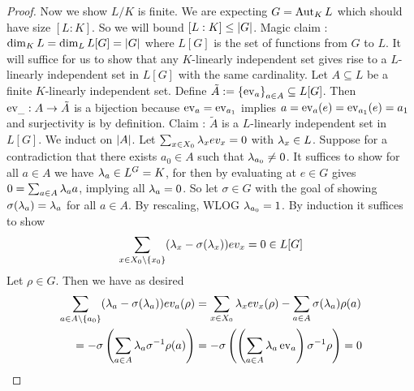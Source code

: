 \documentclass{article}
\begin{document}
\begin{proof}
  Now we show $L / K$ is finite.
  We are expecting $G = \operatorname{Aut}_K L$ which should have size $[L : K]$.
  So we will bound $[L : K] \leq \left\vert G \right\vert$.
  Magic claim : 
  $\dim_K L = \dim_L L[G] = \left\vert G \right\vert$
  where $L[G]$ is the set of functions from $G$ to $L$.
  It will suffice for us to show that
  any $K$-linearly independent set gives rise to
  a $L$-linearly independent set in $L[G]$ with the same cardinality.
  Let $A \subseteq L$ be a finite $K$-linearly independent set.
  Define $\tilde{A} := \left\{\operatorname{ev}_a\right\}_{a \in A} \subseteq L[G]$.
  Then $\operatorname{ev}_\_ : A \to \tilde{A}$ is a bijection
  because $\operatorname{ev}_{a} = \operatorname{ev}_{a_1}$ implies
  $a = \operatorname{ev}_a (e) = \operatorname{ev}_{a_1}(e) = a_1$ and surjectivity is by definition.
  Claim : 
  $\tilde{A}$ is a $L$-linearly independent set in $L[G]$.
  We induct on $\left\vert A \right\vert$.
  Let $\sum_{x \in X_0} \lambda_x ev_x = 0$ with $\lambda_x \in L$. 
  Suppose for a contradiction 
  that there exists $a_0 \in A$ such that $\lambda_{a_0} \neq 0$. 
  It suffices to show for all $a \in A$
  we have $\lambda_a \in L^G = K$,
  for then by evaluating at $e \in G$ gives 
  $0 = \sum_{a \in A} \lambda_a a$,
  implying all $\lambda_a = 0$. 
  So let $\sigma \in G$ with the goal of showing $\sigma(\lambda_a) = \lambda_a$ for
  all $a \in A$.
  By rescaling, WLOG $\lambda_{a_0} = 1$. 
  By induction it suffices to show \[
    \sum_{x \in X_0 \setminus\{x_0\}} (\lambda_x - \sigma(\lambda_x)) ev_x
    = 0 \in L[G]
  \]
  Let $\rho \in G$. Then we have as desired
  \begin{align*}
    \sum_{a \in A \setminus\{a_0\}} (\lambda_a - \sigma(\lambda_a)) ev_a (\rho)
    &= \sum_{x \in X_0} \lambda_x ev_x (\rho) - 
    \sum_{a \in A} \sigma(\lambda_a) \rho(a)
    \\
    = - \sigma \left( 
        \sum_{a \in A} \lambda_a \sigma^{-1}\rho(a)
      \right)
    &= - \sigma\left(
      \left(
        \sum_{a \in A} \lambda_a \operatorname{ev}_a
      \right) \sigma^{-1}\rho
    \right)
    = 0 
  \end{align*}
\end{proof}
\end{document}
